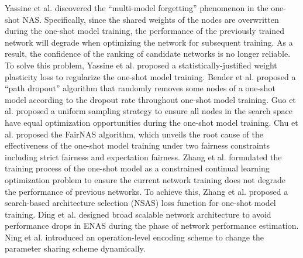 \documentclass[journal]{IEEEtran}
\begin{document}
Yassine et al. \cite{benyahia2019overcoming} discovered the “multi-model forgetting” phenomenon in the one-shot NAS. Specifically, since the shared weights of the nodes are overwritten during the one-shot model training, the performance of the previously trained network will degrade when optimizing the network for subsequent training. As a result, the confidence of the ranking of candidate networks is no longer reliable. To solve this problem, Yassine et al. proposed a  statistically-justified weight plasticity loss to regularize the one-shot model training. Bender et al. \cite{bender2018understanding} proposed a “path dropout” algorithm that randomly removes some nodes of a one-shot model according to the dropout rate throughout one-shot model training. Guo et al. \cite{guo2020single} proposed a uniform sampling strategy to ensure all nodes in the search space have equal optimization opportunities during the one-shot model training. Chu et al. \cite{chu2021fairnas} proposed the FairNAS algorithm, which unveils the root cause of the effectiveness of the one-shot model training under two fairness constraints including strict fairness and expectation fairness. Zhang et al. \cite{zhang2020one} formulated the training process of the one-shot model as a constrained continual learning optimization problem to ensure the current network training does not degrade the performance of previous networks. To achieve this, Zhang et al. \cite{zhang2020one} proposed a search-based architecture selection (NSAS) loss function for one-shot model training. Ding et al. \cite{ding2021bnas} designed broad scalable network architecture to avoid performance drops in ENAS during the phase of network performance estimation. Ning et al. \cite{zhou2022close} introduced an operation-level encoding scheme to change the parameter sharing scheme dynamically.

\end{document}
